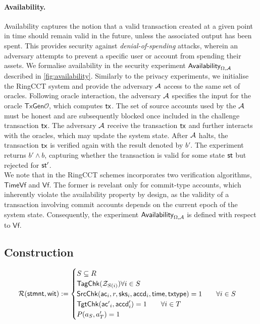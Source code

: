 \paragraph*{Availability.} Availability captures the notion that a valid transaction created at a given point in time should remain valid in the future, unless the associated output has been spent. This provides security against \textit{denial-of-spending} attacks, wherein an adversary attempts to prevent a specific user or account from spending their assets.  We formalise availability in the security experiment $\mathsf{Availability}_{\Omega,\mathcal{A}}$ described in \ref{fig:availability}. Similarly to the privacy experiments, we initialise the RingCCT system and provide the adversary $\mathcal{A}$ access to the same set of oracles. Following oracle interaction, the adversary $\mathcal{A}$ specifies the input for the oracle $\mathsf{TxGen}\mathcal{O}$, which computes $\mathsf{tx}$. The set of source accounts used by the $\mathcal{A}$ must be honest and are subsequently blocked once included in the challenge transaction $\mathsf{tx}$. The adversary $\mathcal{A}$ receive the transaction $\mathsf{tx}$ and further interacts with the oracles, which may update the system state. After $\mathcal{A}$ halts, the transaction $\mathsf{tx}$ is verified again with the result denoted by $b'$. The experiment returns $b' \land b$, capturing whether the transaction is valid for some state $\st$ but rejected for $\st'$. \\
We note that in the RingCCT schemes incorporates two verification algorithms, $\mathsf{TimeVf}$ and $\mathsf{Vf}$. The former is revelant only for commit-type accounts, which inherently violate the availability property by design, as the validity of a transaction involving commit accounts depends on the current epoch of the system state. Consequently, the experiment $\mathsf{Availability}_{\Omega,\mathcal{A}}$ is defined with respect to $\mathsf{Vf}$.

\newpage

\subsection{Construction}

\begin{equation*}
\mathcal{R}(\mathsf{stmnt}, \mathsf{wit}) := \begin{cases} 
    S \subseteq R \\ 
    \mathsf{TagChk}(\mathcal{Z}_{S(i)}) \forall i \in S \\
    \mathsf{SrcChk}(\mathsf{ac}_i, r, \mathsf{sks}_i, \mathsf{accd}_i, \mathsf{time}, \mathsf{txtype}) = 1 \qquad \forall i \in S \\ 
    \mathsf{TgtChk}(\mathsf{ac'}_i, \mathsf{accd}'_i) = 1 \qquad \forall i \in T \\ 
    P(a_S, a'_T) = 1
\end{cases}
\end{equation*}

